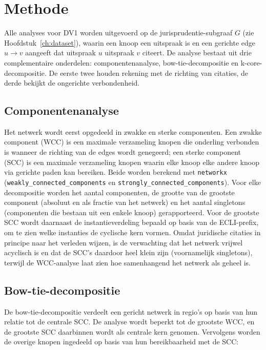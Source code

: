 \documentclass[a4paper, 12pt]{report}
\begin{document}
\section{Methode}

Alle analyses voor DV1 worden uitgevoerd op de jurisprudentie-subgraaf $G$ (zie Hoofdstuk~\ref{ch:dataset}), waarin een knoop een uitspraak is en een gerichte edge $u \rightarrow v$ aangeeft dat uitspraak $u$ uitspraak $v$ citeert. De analyse bestaat uit drie complementaire onderdelen: componentenanalyse, bow-tie-decompositie en k-core-decompositie. De eerste twee houden rekening met de richting van citaties, de derde bekijkt de ongerichte verbondenheid.


\subsection{Componentenanalyse} Het netwerk wordt eerst opgedeeld in zwakke en sterke componenten. Een zwakke component (WCC) is een maximale verzameling knopen die onderling verbonden is wanneer de richting van de edges wordt genegeerd; een sterke component (SCC) is een maximale verzameling knopen waarin elke knoop elke andere knoop via gerichte paden kan bereiken. Beide worden berekend met \texttt{networkx} (\texttt{weakly\_connected\_components} en \texttt{strongly\_connected\_components}). Voor elke decompositie worden het aantal componenten, de grootte van de grootste component (absoluut en als fractie van het netwerk) en het aantal singletons (componenten die bestaan uit een enkele knoop) gerapporteerd. Voor de grootste SCC wordt daarnaast de instantieverdeling bepaald op basis van de ECLI-prefix, om te zien welke instanties de cyclische kern vormen. Omdat juridische citaties in principe naar het verleden wijzen, is de verwachting dat het netwerk vrijwel acyclisch is en dat de SCC's daardoor heel klein zijn (voornamelijk singletons), terwijl de WCC-analyse laat zien hoe samenhangend het netwerk als geheel is.



\subsection{Bow-tie-decompositie} De bow-tie-decompositie \parencite{broder2000} verdeelt een gericht netwerk in regio's op basis van hun relatie tot de centrale SCC. De analyse wordt beperkt tot de grootste WCC, en de grootste SCC daarbinnen wordt als centrale kern genomen. Vervolgens worden de overige knopen ingedeeld op basis van hun bereikbaarheid met de SCC:
\end{document}
